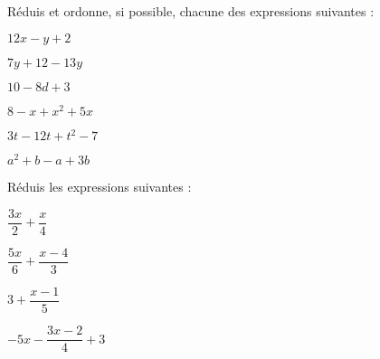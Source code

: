 \begin{exercice}
Réduis et ordonne, si possible, chacune des expressions suivantes :

\begin{colenumerate}{2} 
\item $12x -y + 2$
\item $7y + 12 -13y$
\item $10 -8d + 3$
\item $8 -x + x^2 + 5x$
\item $3t -12t + t^2 -7$
\item $a^2 + b -a + 3b $
\end{colenumerate} 
\end{exercice}

\begin{exercice}
Réduis les expressions suivantes :

\begin{colenumerate}{2} 
\item $\dfrac{3x}{2} + \dfrac{x}{4}$
\item $\dfrac{5x}{6}+\dfrac{x-4}{3}$
\item $3 + \dfrac{x-1}{5}$
\item $-5x - \dfrac{3x-2}{4} + 3$
\end{colenumerate}
\end{exercice}
